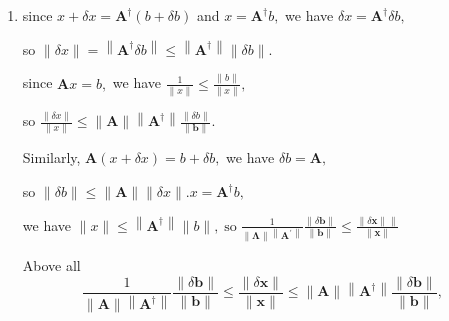 \documentclass[english,onecolumn]{IEEEtran}
\begin{document}
\begin{enumerate}
	\item since $x+\delta x=\mathbf{A}^{\dagger}(b+\delta b)$ and $x=\mathbf{A}^{\dagger} b,$ we have $\delta x=\mathbf{A}^{\dagger} \delta b,$
	
	 so $\|\delta x\|=\left\|\mathbf{A}^{\dagger} \delta b\right\| \leq\left\|\mathbf{A}^{\dagger}\right\|\|\delta b\|$.
	 
	since $\mathbf{A} x=b,$ we have $\frac{1}{\|x\|} \leq \frac{\|b\|}{\|x\|},$ 
	
	so $\frac{\|\delta x\|}{\|x\|} \leq\|\mathbf{A}\|\left\|\mathbf{A}^{\dagger}\right\| \frac{\|\delta b\|}{\|\mathbf{b}\|} .$
	
	Similarly, $\mathbf{A}(x+\delta x)=b+\delta b,$ we have $\delta b=\mathbf{A},$ 
	
	so $\|\delta b\| \leq\|\mathbf{A}\|\|\delta x\| . x=\mathbf{A}^{\dagger} b,$ 
	
	we have
	$\|x\| \leq\left\|\mathbf{A}^{\dagger}\right\|\|b\|, \operatorname{so} \frac{1}{\|\boldsymbol{\Lambda}\|\left\|\boldsymbol{A}^{\prime}\right\|} \frac{\|\delta \mathbf{b}\|}{\|\mathbf{b}\|} \leq \frac{\|\delta \mathbf{x}\| \|}{\|\mathbf{x}\|}$
	
	Above all
	$$
	\frac{1}{\|\mathbf{A}\|\left\|\mathbf{A}^{\dagger}\right\|} \frac{\|\delta \mathbf{b}\|}{\|\mathbf{b}\|} \leq \frac{\|\delta \mathbf{x}\|}{\|\mathbf{x}\|} \leq\|\mathbf{A}\|\left\|\mathbf{A}^{\dagger}\right\| \frac{\|\delta \mathbf{b}\|}{\|\mathbf{b}\|},
	$$
	

\end{enumerate}
\end{document}
